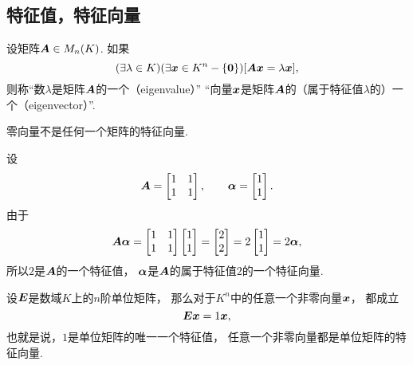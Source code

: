 \subsection{特征值，特征向量}
\begin{definition}
设矩阵\(\boldsymbol{A} \in M_n(K)\).
如果\[
	(\exists \lambda \in K)
	(\exists \boldsymbol{x} \in K^n - \{\boldsymbol0\})
	[\boldsymbol{A}\boldsymbol{x} = \lambda\boldsymbol{x}],
\]
则称“数\(\lambda\)是矩阵\(\boldsymbol{A}\)的一个（eigenvalue）”
“向量\(\boldsymbol{x}\)是矩阵\(\boldsymbol{A}\)的（属于特征值\(\lambda\)的）一个（eigenvector）”.
\end{definition}
\begin{remark}
零向量不是任何一个矩阵的特征向量.
\end{remark}
\begin{example}
设\[
	\boldsymbol{A} = \begin{bmatrix}
		1 & 1 \\ 1 & 1
	\end{bmatrix},
	\qquad
	\boldsymbol\alpha = \begin{bmatrix}
		1 \\ 1
	\end{bmatrix}.
\]
由于\[
	\boldsymbol{A} \boldsymbol\alpha
	= \begin{bmatrix}
		1 & 1 \\ 1 & 1
	\end{bmatrix}
	\begin{bmatrix}
		1 \\ 1
	\end{bmatrix}
	= \begin{bmatrix}
		2 \\ 2
	\end{bmatrix}
	= 2 \begin{bmatrix}
		1 \\ 1
	\end{bmatrix}
	= 2 \boldsymbol\alpha,
\]
所以\(2\)是\(\boldsymbol{A}\)的一个特征值，
\(\boldsymbol\alpha\)是\(\boldsymbol{A}\)的属于特征值\(2\)的一个特征向量.
\end{example}
\begin{example}
设\(\boldsymbol{E}\)是数域\(K\)上的\(n\)阶单位矩阵，
那么对于\(K^n\)中的任意一个非零向量\(\boldsymbol{x}\)，
都成立\[
	\boldsymbol{E} \boldsymbol{x} = 1 \boldsymbol{x},
\]
也就是说，\(1\)是单位矩阵的唯一一个特征值，
任意一个非零向量都是单位矩阵的特征向量.
\end{example}

